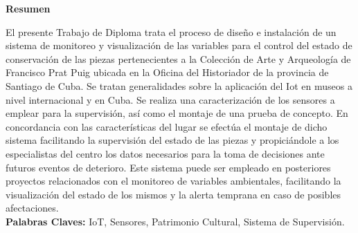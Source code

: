 \setcounter{page}{4}
\thispagestyle{plain}

    \textbf{\LARGE Resumen}
\newline

El presente Trabajo de Diploma trata el proceso de diseño e instalación de un sistema de monitoreo y visualización de las variables para el control del estado de conservación de las piezas pertenecientes a la Colección de Arte y Arqueología de Francisco Prat Puig ubicada en la Oficina del Historiador de la provincia de Santiago de Cuba. Se tratan generalidades sobre la aplicación del Iot en museos a nivel internacional y en Cuba. Se realiza una caracterización de los sensores a emplear para la supervisión, así como el montaje de una prueba de concepto.
En concordancia con las características del lugar se efectúa el montaje de dicho sistema facilitando la supervisión del estado de las piezas y propiciándole a los especialistas del centro los datos necesarios para la toma de decisiones ante futuros eventos de deterioro. Este sistema puede ser empleado en posteriores proyectos relacionados con el monitoreo de variables ambientales, facilitando la visualización del estado de los mismos y la alerta temprana en caso de posibles afectaciones.\\

\textbf{Palabras Claves: } IoT, Sensores, Patrimonio Cultural, Sistema de Supervisión.